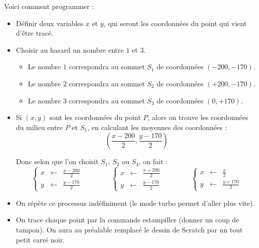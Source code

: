 \documentclass[class=report,crop=false, 12pt]{standalone}
\begin{document}
\begin{activite}
Voici comment programmer :
\begin{itemize}
  \item Définir deux variables $x$ et $y$, qui seront les coordonnées du point qui vient d'être tracé.
  
  \item Choisir au hasard un nombre entre $1$ et $3$.
  \begin{itemize}
    \item Le nombre $1$ correspondra au sommet $S_1$ de coordonnées $(-200,-170)$.
    \item Le nombre $2$ correspondra au sommet $S_2$ de coordonnées $(+200,-170)$.
    \item Le nombre $3$ correspondra au sommet $S_3$ de coordonnées $(0,+170)$.        
  \end{itemize}
    
  \item Si $(x,y)$ sont les coordonnées du point $P$, alors on trouve les coordonnées
  du milieu entre $P$ et $S_1$, en calculant les moyennes des coordonnées :
  $$\left(\frac{x-200}{2} ,\frac{y-170}{2}\right)$$
  
  Donc selon que l'on choisit $S_1$, $S_2$ ou $S_3$, on fait :
  $$
  \left\{\begin{array}{rcl}x &\leftarrow& \frac{x - 200}{2} \\ y &\leftarrow& \frac{y -170}{2}\end{array}\right.\qquad\qquad
  \left\{\begin{array}{rcl}x &\leftarrow& \frac{x + 200}{2} \\ y &\leftarrow& \frac{y -170}{2}\end{array}\right.\qquad\qquad
  \left\{\begin{array}{rcl}x &\leftarrow& \frac{x}{2}  \\ y &\leftarrow& \frac{y + 170}{2}\end{array}\right.
  $$
  
  \item On répète ce processus indéfiniment (le mode turbo permet d'aller plus vite).
  
  \item On trace chaque point par la commande \og estampiller \fg{} (donner un coup de tampon). On aura au préalable remplacé le dessin de Scratch par un tout petit carré noir.
\end{itemize}


\end{activite}
\end{document}

